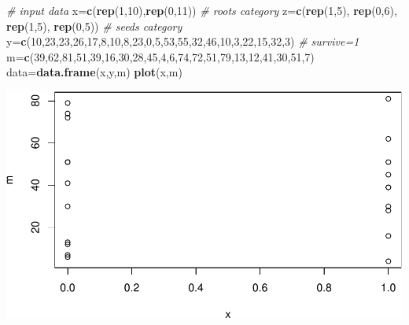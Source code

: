 \documentclass[
]{article}
\newenvironment{Shaded}{\begin{snugshade}}{\end{snugshade}}
\newcommand{\CommentTok}[1]{\textcolor[rgb]{0.56,0.35,0.01}{\textit{#1}}}
\newcommand{\DecValTok}[1]{\textcolor[rgb]{0.00,0.00,0.81}{#1}}
\newcommand{\FunctionTok}[1]{\textcolor[rgb]{0.13,0.29,0.53}{\textbf{#1}}}
\newcommand{\NormalTok}[1]{#1}
\newcommand{\OtherTok}[1]{\textcolor[rgb]{0.56,0.35,0.01}{#1}}
\begin{document}
\begin{Shaded}
\begin{Highlighting}[]
\CommentTok{\# input data}
\NormalTok{x}\OtherTok{=}\FunctionTok{c}\NormalTok{(}\FunctionTok{rep}\NormalTok{(}\DecValTok{1}\NormalTok{,}\DecValTok{10}\NormalTok{),}\FunctionTok{rep}\NormalTok{(}\DecValTok{0}\NormalTok{,}\DecValTok{11}\NormalTok{)) }\CommentTok{\# roots category}
\NormalTok{z}\OtherTok{=}\FunctionTok{c}\NormalTok{(}\FunctionTok{rep}\NormalTok{(}\DecValTok{1}\NormalTok{,}\DecValTok{5}\NormalTok{), }\FunctionTok{rep}\NormalTok{(}\DecValTok{0}\NormalTok{,}\DecValTok{6}\NormalTok{), }\FunctionTok{rep}\NormalTok{(}\DecValTok{1}\NormalTok{,}\DecValTok{5}\NormalTok{), }\FunctionTok{rep}\NormalTok{(}\DecValTok{0}\NormalTok{,}\DecValTok{5}\NormalTok{)) }\CommentTok{\# seeds category}
\NormalTok{y}\OtherTok{=}\FunctionTok{c}\NormalTok{(}\DecValTok{10}\NormalTok{,}\DecValTok{23}\NormalTok{,}\DecValTok{23}\NormalTok{,}\DecValTok{26}\NormalTok{,}\DecValTok{17}\NormalTok{,}\DecValTok{8}\NormalTok{,}\DecValTok{10}\NormalTok{,}\DecValTok{8}\NormalTok{,}\DecValTok{23}\NormalTok{,}\DecValTok{0}\NormalTok{,}\DecValTok{5}\NormalTok{,}\DecValTok{53}\NormalTok{,}\DecValTok{55}\NormalTok{,}\DecValTok{32}\NormalTok{,}\DecValTok{46}\NormalTok{,}\DecValTok{10}\NormalTok{,}\DecValTok{3}\NormalTok{,}\DecValTok{22}\NormalTok{,}\DecValTok{15}\NormalTok{,}\DecValTok{32}\NormalTok{,}\DecValTok{3}\NormalTok{) }\CommentTok{\# survive=1}
\NormalTok{m}\OtherTok{=}\FunctionTok{c}\NormalTok{(}\DecValTok{39}\NormalTok{,}\DecValTok{62}\NormalTok{,}\DecValTok{81}\NormalTok{,}\DecValTok{51}\NormalTok{,}\DecValTok{39}\NormalTok{,}\DecValTok{16}\NormalTok{,}\DecValTok{30}\NormalTok{,}\DecValTok{28}\NormalTok{,}\DecValTok{45}\NormalTok{,}\DecValTok{4}\NormalTok{,}\DecValTok{6}\NormalTok{,}\DecValTok{74}\NormalTok{,}\DecValTok{72}\NormalTok{,}\DecValTok{51}\NormalTok{,}\DecValTok{79}\NormalTok{,}\DecValTok{13}\NormalTok{,}\DecValTok{12}\NormalTok{,}\DecValTok{41}\NormalTok{,}\DecValTok{30}\NormalTok{,}\DecValTok{51}\NormalTok{,}\DecValTok{7}\NormalTok{)}
\NormalTok{data}\OtherTok{=}\FunctionTok{data.frame}\NormalTok{(x,y,m)}
\FunctionTok{plot}\NormalTok{(x,m)}
\end{Highlighting}
\end{Shaded}

\includegraphics{yc4384_hw3_files/figure-latex/unnamed-chunk-3-1.pdf}
\end{document}
